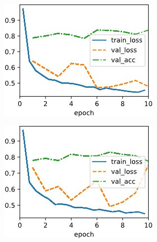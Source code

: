 \documentclass{article}
\begin{document}
\begin{figure}[ht]
\vskip 0.2in
\begin{center}\centering
\begin{subfigure}[b]{0.3\columnwidth}\centering
\includegraphics[width=\columnwidth]{img/lr0.2 sgd.jpg}
\end{subfigure}
\hfill
\begin{subfigure}[b]{0.3\columnwidth}\centering
\includegraphics[width=\columnwidth]{img/lr0.2 gravity.jpg}
\end{subfigure}
\hfill
\begin{subfigure}[b]{0.3\columnwidth}\centering

\end{subfigure}
\end{center}
\end{figure}
\end{document}
